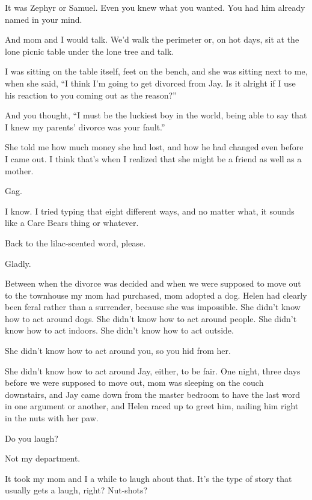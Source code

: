 \begin{ally}
It was Zephyr or Samuel. Even you knew what you wanted. You had him already named in your mind.
\end{ally}
And mom and I would talk. We'd walk the perimeter or, on hot days, sit at the lone picnic table under the lone tree and talk.

I was sitting on the table itself, feet on the bench, and she was sitting next to me, when she said, ``I think I'm going to get divorced from Jay. Is it alright if I use his reaction to you coming out as the reason?''

\begin{ally}
And you thought, ``I must be the luckiest boy in the world, being able to say that I knew my parents' divorce was your fault.''
\end{ally}
She told me how much money she had lost, and how he had changed even before I came out. I think that's when I realized that she might be a friend as well as a mother.

\begin{ally}
Gag.
\end{ally}
I know. I tried typing that eight different ways, and no matter what, it sounds like a Care Bears thing or whatever.

\begin{ally}
Back to the lilac-scented word, please.
\end{ally}
Gladly.
\newpage

\noindent Between when the divorce was decided and when we were supposed to move out to the townhouse my mom had purchased, mom adopted a dog. Helen had clearly been feral rather than a surrender, because she was impossible. She didn't know how to act around dogs. She didn't know how to act around people. She didn't know how to act indoors. She didn't know how to act outside.

\begin{ally}
She didn't know how to act around you, so you hid from her.
\end{ally}
She didn't know how to act around Jay, either, to be fair. One night, three days before we were supposed to move out, mom was sleeping on the couch downstairs, and Jay came down from the master bedroom to have the last word in one argument or another, and Helen raced up to greet him, nailing him right in the nuts with her paw.

Do you laugh?

\begin{ally}
Not my department.
\end{ally}
It took my mom and I a while to laugh about that. It's the type of story that usually gets a laugh, right? Nut-shots?

